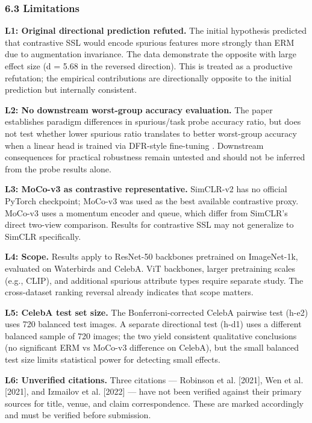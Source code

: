 \subsubsection{6.3 Limitations}

\textbf{L1: Original directional prediction refuted.} The initial hypothesis predicted that contrastive SSL would encode spurious features more strongly than ERM due to augmentation invariance. The data demonstrate the opposite with large effect size (d = 5.68 in the reversed direction). This is treated as a productive refutation; the empirical contributions are directionally opposite to the initial prediction but internally consistent.

\textbf{L2: No downstream worst-group accuracy evaluation.} The paper establishes paradigm differences in spurious/task probe accuracy ratio, but does not test whether lower spurious ratio translates to better worst-group accuracy when a linear head is trained via DFR-style fine-tuning \citep{Kirichenko2022}. Downstream consequences for practical robustness remain untested and should not be inferred from the probe results alone.

\textbf{L3: MoCo-v3 as contrastive representative.} SimCLR-v2 has no official PyTorch checkpoint; MoCo-v3 was used as the best available contrastive proxy. MoCo-v3 uses a momentum encoder and queue, which differ from SimCLR's direct two-view comparison. Results for contrastive SSL may not generalize to SimCLR specifically.

\textbf{L4: Scope.} Results apply to ResNet-50 backbones pretrained on ImageNet-1k, evaluated on Waterbirds and CelebA. ViT backbones, larger pretraining scales (e.g., CLIP), and additional spurious attribute types require separate study. The cross-dataset ranking reversal already indicates that scope matters.

\textbf{L5: CelebA test set size.} The Bonferroni-corrected CelebA pairwise test (h-e2) uses 720 balanced test images. A separate directional test (h-d1) uses a different balanced sample of 720 images; the two yield consistent qualitative conclusions (no significant ERM vs MoCo-v3 difference on CelebA), but the small balanced test size limits statistical power for detecting small effects.

\textbf{L6: Unverified citations.} Three citations --- Robinson et al. [2021], Wen et al. [2021], and Izmailov et al. [2022] --- have not been verified against their primary sources for title, venue, and claim correspondence. These are marked accordingly and must be verified before submission.

